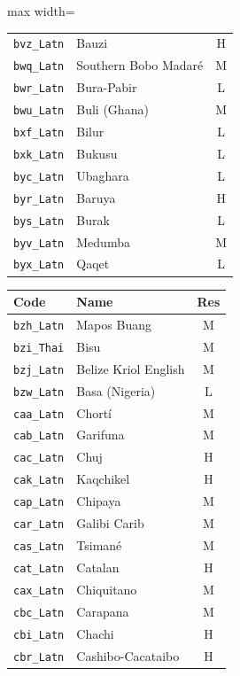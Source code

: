 {\begin{adjustbox}{max width=\textwidth}
\begin{tabular}{llc}
        \texttt{bvz\_Latn} & Bauzi & H \\
        \texttt{bwq\_Latn} & Southern Bobo Madaré & M \\
        \texttt{bwr\_Latn} & Bura-Pabir & L \\
        \texttt{bwu\_Latn} & Buli (Ghana) & M \\
        \texttt{bxf\_Latn} & Bilur & L \\
        \texttt{bxk\_Latn} & Bukusu & L \\
        \texttt{byc\_Latn} & Ubaghara & L \\
        \texttt{byr\_Latn} & Baruya & H \\
        \texttt{bys\_Latn} & Burak & L \\
        \texttt{byv\_Latn} & Medumba & M \\
        \texttt{byx\_Latn} & Qaqet & L \\
        \bottomrule
    \end{tabular}
    \quad
    \begin{tabular}{llc}
        \toprule
        \textbf{Code} & \textbf{Name} & \textbf{Res}\\
        \midrule
        \texttt{bzh\_Latn} & Mapos Buang & M \\
        \texttt{bzi\_Thai} & Bisu & M \\
        \texttt{bzj\_Latn} & Belize Kriol English & M \\
        \texttt{bzw\_Latn} & Basa (Nigeria) & L \\
        \texttt{caa\_Latn} & Chortí & M \\
        \texttt{cab\_Latn} & Garifuna & M \\
        \texttt{cac\_Latn} & Chuj & H \\
        \texttt{cak\_Latn} & Kaqchikel & H \\
        \texttt{cap\_Latn} & Chipaya & M \\
        \texttt{car\_Latn} & Galibi Carib & M \\
        \texttt{cas\_Latn} & Tsimané & M \\
        \texttt{cat\_Latn} & Catalan & H \\
        \texttt{cax\_Latn} & Chiquitano & M \\
        \texttt{cbc\_Latn} & Carapana & M \\
        \texttt{cbi\_Latn} & Chachi & H \\
        \texttt{cbr\_Latn} & Cashibo-Cacataibo & H \\

\end{tabular}
\end{adjustbox}}
